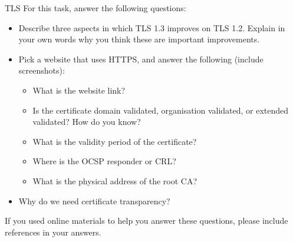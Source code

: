 \documentclass{homework}
\begin{document}
\begin{task}{TLS}
  For this task, answer the following questions:
  \begin{itemize}
    \item Describe three aspects in which TLS 1.3 improves on TLS 1.2.
    Explain in your own words why you think these are important improvements.

    \item Pick a website that uses HTTPS, and answer the following (include screenshots):
    \begin{itemize}
      \item What is the website link?
      \item Is the certificate domain validated, organisation validated, or extended validated?
      How do you know?
      \item What is the validity period of the certificate?
      \item Where is the OCSP responder or CRL?
      \item What is the physical address of the root CA?
    \end{itemize}

    \item Why do we need certificate transparency?
  \end{itemize}

  If you used online materials to help you answer these questions, please include references in your answers.
\end{task}
\end{document}
